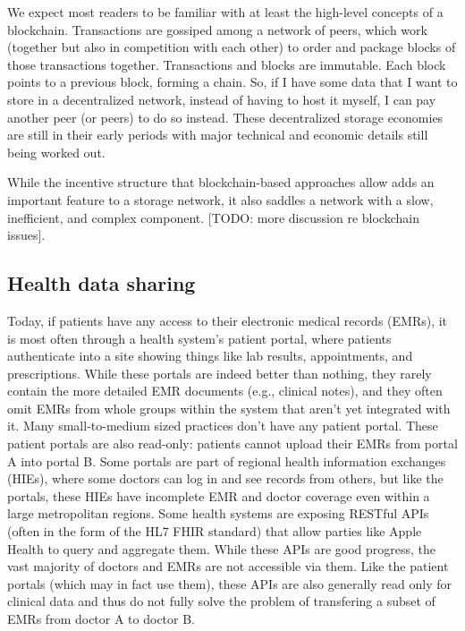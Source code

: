 \documentclass[10pt]{article}
\begin{document}
We expect most readers to be familiar with at least the high-level concepts of a blockchain. Transactions are gossiped among a network of peers, which work (together but also in competition with each other) to order and package blocks of those transactions together. Transactions and blocks are immutable. Each block points to a previous block, forming a chain. So, if I have some data that I want to store in a decentralized network, instead of having to host it myself, I can pay another peer (or peers) to do so instead. These decentralized storage economies are still in their early periods with major technical and economic details still being worked out.

While the incentive structure that blockchain-based approaches allow adds an important feature to a storage network, it also saddles a network with a slow, inefficient, and complex component. [TODO: more discussion re blockchain issues].

\subsection{Health data sharing}
Today, if patients have any access to their electronic medical records (EMRs), it is most often through a health system's patient portal, where patients authenticate into a site showing things like lab results, appointments, and prescriptions. While these portals are indeed better than nothing, they rarely contain the more detailed EMR documents (e.g., clinical notes), and they often omit EMRs from whole groups within the system that aren't yet integrated with it. Many small-to-medium sized practices don't have any patient portal. These patient portals are also read-only: patients cannot upload their EMRs from portal A into portal B. Some portals are part of regional health information exchanges (HIEs), where some doctors can log in and see records from others, but like the portals, these HIEs have incomplete EMR and doctor coverage even within a large metropolitan regions. Some health systems are exposing RESTful APIs (often in the form of the HL7 FHIR standard) that allow  parties like Apple Health to query and aggregate them. While these APIs are good progress, the vast majority of doctors and EMRs are not accessible via them. Like the patient portals (which may in fact use them), these APIs are also generally read only for clinical data and thus do not fully solve the problem of transfering a subset of EMRs from doctor A to doctor B.
\end{document}
